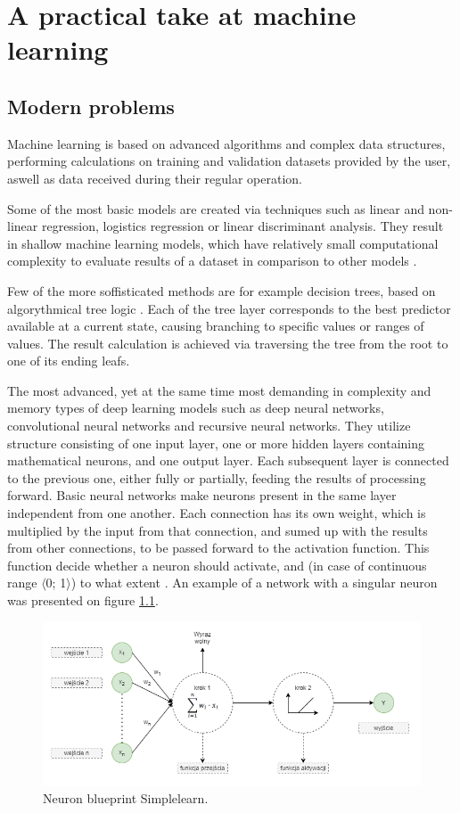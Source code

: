 \chapter{A practical take at machine learning}
\section{Modern problems}

Machine learning is based on advanced algorithms and complex data structures, performing calculations on training and validation datasets provided by the user, aswell as data received during their regular operation.

Some of the most basic models are created via techniques such as linear and non-linear regression, logistics regression or linear discriminant analysis. They result in shallow machine learning models, which have relatively small computational complexity to evaluate results of a dataset in comparison to other models \cite{shallow}.

Few of the more soffisticated methods are for example decision trees, based on algorythmical tree logic \cite{tree}. Each of the tree layer corresponds to the best predictor available at a current state, causing branching to specific values or ranges of values. The result calculation is achieved via traversing the tree from the root to one of its ending leafs. 

The most advanced, yet at the same time most demanding in complexity and memory types of deep learning models such as deep neural networks, convolutional neural networks and recursive neural networks. They utilize structure consisting of one input layer, one or more hidden layers containing mathematical neurons, and one output layer. Each subsequent layer is connected to the previous one, either fully or partially, feeding the results of processing forward. Basic neural networks make neurons present in the same layer independent from one another. Each connection has its own weight, which is multiplied by the input from that connection, and sumed up with the results from other connections, to be passed forward to the activation function. This function decide whether a neuron should activate, and (in case of continuous range $\langle$0; 1$\rangle$) to what extent \cite{mit_neural}. An example of a network with a singular neuron was presented on figure \ref{fig:nn}.

\begin{figure}[!ht]
    \centering
    \includegraphics[width=150mm]{Rysunki/Rozdzial2/neuron.png}
    \caption{Neuron blueprint \dywiz{} Simplelearn.}
    \label{fig:nn}
\end{figure}

